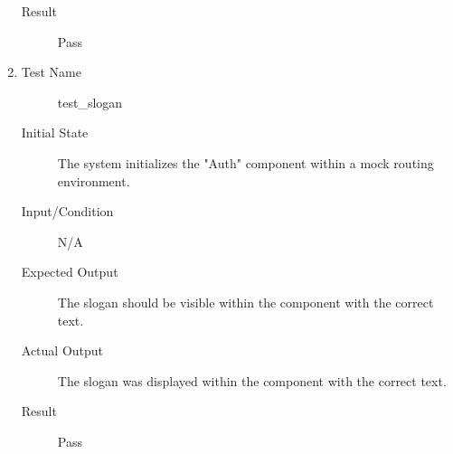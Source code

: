 \documentclass[12pt, titlepage]{article}
\begin{document}
\begin{enumerate}[UT-UA1]
\begin{description}
  \item[Result] Pass
  \end{description}
\item \label{UT-UA4}
  \begin{description}
  \item[Test Name] test\_slogan
  \item[Initial State] The system initializes the "Auth" component within a mock
    routing environment.
  \item[Input/Condition] N/A
  \item[Expected Output] The slogan should be visible within the component with
    the correct text.
  \item[Actual Output] The slogan was displayed within the component with the
    correct text.
  \item[Result] Pass
  \end{description}
\end{enumerate}
\end{document}
